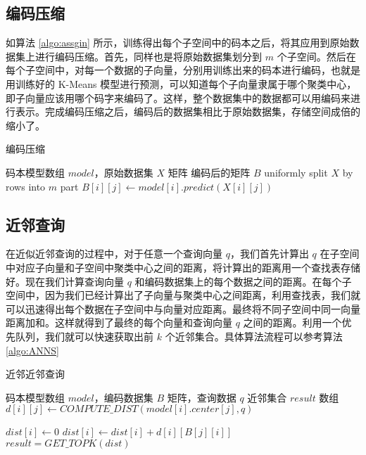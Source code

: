\subsection{编码压缩}
如算法 \ref{algo:assgin} 所示，训练得出每个子空间中的码本之后，将其应用到原始数据集上进行编码压缩。首先，同样也是将原始数据集划分到 $m$ 个子空间。然后在每个子空间中，对每一个数据的子向量，分别用训练出来的码本进行编码，也就是用训练好的 K-Means 模型进行预测，可以知道每个子向量隶属于哪个聚类中心，即子向量应该用哪个码字来编码了。这样，整个数据集中的数据都可以用编码来进行表示。完成编码压缩之后，编码后的数据集相比于原始数据集，存储空间成倍的缩小了。
\begin{algorithm}
    \caption{编码压缩}
    \label{algo:assgin}
    \begin{algorithmic}[1] %
        \Require 码本模型数组 $model$，原始数据集 $X$ 矩阵
        \Ensure 编码后的矩阵 $B$
            \State uniformly split $X$ by rows into $m$ part
                    \State $B[i][j] \gets model[i].predict(X[i][j])$
                \EndFor
            \EndFor
            \State {}
        \EndFunction
    \end{algorithmic}
\end{algorithm}
\subsection{近邻查询}
在近似近邻查询的过程中，对于任意一个查询向量 $q$，我们首先计算出 $q$ 在子空间中对应子向量和子空间中聚类中心之间的距离，将计算出的距离用一个查找表存储好。现在我们计算查询向量 $q$ 和编码数据集上的每个数据之间的距离。在每个子空间中，因为我们已经计算出了子向量与聚类中心之间距离，利用查找表，我们就可以迅速得出每个数据在子空间中与向量对应距离。最终将不同子空间中同一向量距离加和。这样就得到了最终的每个向量和查询向量 $q$ 之间的距离。利用一个优先队列，我们就可以快速获取出前 $k$ 个近邻集合。具体算法流程可以参考算法 \ref{algo:ANNS}
\begin{algorithm}
    \caption{近邻近邻查询}
    \label{algo:ANNS}
    \begin{algorithmic}[1] %
        \Require 码本模型数组 $model$，编码数据集 $B$ 矩阵，查询数据 $q$
        \Ensure 近邻集合 $result$ 数组
                    \State $d[i][j] \gets COMPUTE\_DIST(model[i].center[j], q) $
                \EndFor
            \EndFor

                \State $dist[i] \gets 0$
                    \State $dist[i] \gets dist[i] + d[i][B[j][i]]$
                \EndFor
            \EndFor
            \State $result = GET\_TOPK(dist)$
            \State {}
        \EndFunction
    \end{algorithmic}
\end{algorithm}
